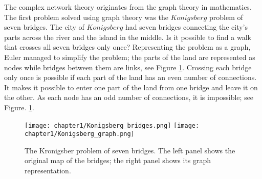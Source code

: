 



The complex network theory originates from the graph theory in mathematics. The first problem solved using graph theory was the $Konigsberg$ problem of seven bridges. The city of $Konigsberg$ had seven bridges connecting the city's parts across the river and the island in the middle. Is it possible to find a walk that crosses all seven bridges only once? Representing the problem as a graph, Euler managed to simplify the problem; the parts of the land are represented as nodes while bridges between them are links, see Figure \ref{fig:Krgraph}. Crossing each bridge only once is possible if each part of the land has an even number of connections. It makes it possible to enter one part of the land from one bridge and leave it on the other. As each node has an odd number of connections, it is impossible; see Figure. \ref{fig:Krgraph}.

\begin{figure}[!ht]
	\centering
	\texttt{[image: chapter1/Konigsberg\_bridges.png]} \hspace{2cm}
	\texttt{[image: chapter1/Konigsberg\_graph.png]}
	\caption[Konigsberg problem of seven bridges.]{The Kronigsber problem of seven bridges. The left panel shows the original map of the bridges; the right panel shows its graph representation. }
	
	\label{fig:Krgraph}
\end{figure}

